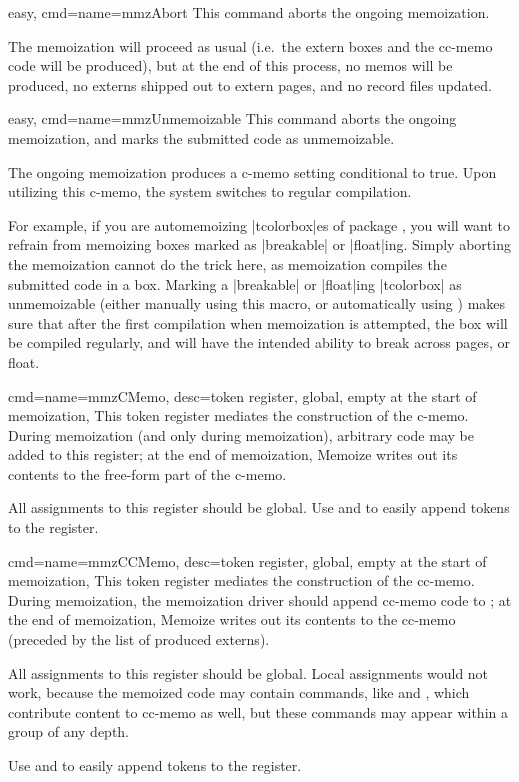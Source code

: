 \documentclass[a4paper,11pt]{article}
\begin{document}
\begin{doc}{easy, cmd={name=mmzAbort}}
  This command aborts the ongoing memoization.

  The memoization will proceed as usual (i.e.\ the extern boxes and the cc-memo
  code will be produced), but at the end of this process, no memos will be
  produced, no externs shipped out to extern pages, and no record files
  updated.
\end{doc}

\begin{doc}{easy, cmd={name=mmzUnmemoizable}}
  This command aborts the ongoing memoization, and marks the submitted code as
  unmemoizable.

  The ongoing memoization produces a c-memo setting conditional
   to true.  Upon utilizing this c-memo, the
  system switches to regular compilation.

  For example, if you are automemoizing |tcolorbox|es of package
  , you will want to refrain from memoizing boxes marked as
  |breakable| or |float|ing.  Simply aborting the memoization cannot do the
  trick here, as memoization compiles the submitted code in a  box.
  Marking a |breakable| or |float|ing |tcolorbox| as unmemoizable (either
  manually using this macro, or automatically using ) makes
  sure that after the first compilation when memoization is attempted, the box
  will be compiled regularly, and will have the intended ability to break
  across pages, or float.
\end{doc}

\begin{doc}{
    cmd={name=mmzCMemo, desc={token register, global, empty at the start of memoization}},
  }
  This token register mediates the construction of the c-memo.  During
  memoization (and only during memoization), arbitrary code may be added to
  this register; at the end of memoization, Memoize writes out its contents to
  the free-form part of the c-memo.

  All assignments to this register should be global.  Use  and
   to easily append tokens to the register.
\end{doc}


\begin{doc}{
    cmd={name=mmzCCMemo, desc={token register, global, empty at the start of memoization}},
  }
  This token register mediates the construction of the cc-memo.  During
  memoization, the memoization driver should append cc-memo code to
  ; at the end of memoization, Memoize writes out its
  contents to the cc-memo (preceded by the list of produced externs).

  All assignments to this register should be global.  Local assignments would
  not work, because the memoized code may contain commands, like  and
  , which contribute content to cc-memo as well, but these commands may
  appear within a  group of any depth.

  Use  and  to easily append tokens to the
  register.
\end{doc}
\end{document}
